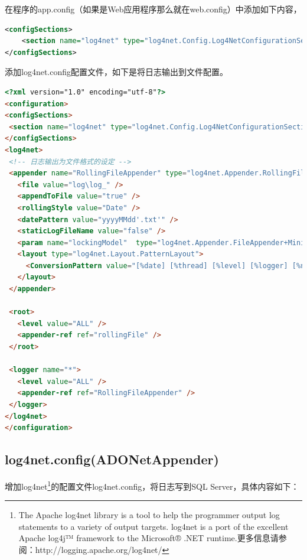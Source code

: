 \documentclass{book}
\begin{document}
在程序的app.config（如果是Web应用程序那么就在web.config）中添加如下内容，

\begin{lstlisting}[language=XML]
<configSections>    
	<section name="log4net" type="log4net.Config.Log4NetConfigurationSectionHandler, log4net"/>
</configSections>
\end{lstlisting}

添加log4net.config配置文件，如下是将日志输出到文件配置。

\begin{lstlisting}[language=HTML]
<?xml version="1.0" encoding="utf-8"?>
<configuration>
<configSections>
 <section name="log4net" type="log4net.Config.Log4NetConfigurationSectionHandler, log4net"/>
</configSections>
<log4net>
 <!-- 日志输出为文件格式的设定 -->
 <appender name="RollingFileAppender" type="log4net.Appender.RollingFileAppender">
   <file value="log\log_" />
   <appendToFile value="true" />
   <rollingStyle value="Date" />
   <datePattern value="yyyyMMdd'.txt'" />
   <staticLogFileName value="false" />
   <param name="lockingModel"  type="log4net.Appender.FileAppender+MinimalLock" />
   <layout type="log4net.Layout.PatternLayout">
     <ConversionPattern value="[%date] [%thread] [%level] [%logger] [%ndc] - %message%newline" />
   </layout>
 </appender>
 
 <root>
   <level value="ALL" />
   <appender-ref ref="rollingFile" />
 </root>

 <logger name="*">
   <level value="ALL" />
   <appender-ref ref="RollingFileAppender" />
 </logger>
</log4net>
</configuration>	
\end{lstlisting}

\subsection{log4net.config(ADONetAppender)}

增加log4net\footnote{The Apache log4net library is a tool to help the programmer output log statements to a variety of output targets. log4net is a port of the excellent Apache log4j™ framework to the Microsoft® .NET runtime.更多信息请参阅：http://logging.apache.org/log4net/}的配置文件log4net.config，将日志写到SQL Server，具体内容如下：
\end{document}
